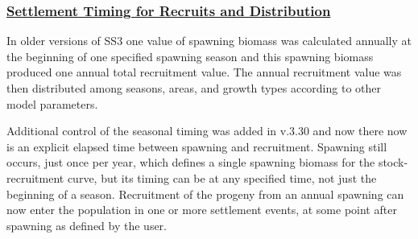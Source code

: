 \hypertarget{SettlementTiming}{}
\subsubsection[Settlement Timing for Recruits and Distribution]{\protect\hyperlink{SettlementTiming}{Settlement Timing for Recruits and Distribution}}
In older versions of SS3 one value of spawning biomass was calculated annually at the beginning of one specified spawning season and this spawning biomass produced one annual total recruitment value. The annual recruitment value was then distributed among seasons, areas, and growth types according to other model parameters.

Additional control of the seasonal timing was added in v.3.30 and now there now is an explicit elapsed time between spawning and recruitment. Spawning still occurs, just once per year, which defines a single spawning biomass for the stock-recruitment curve, but its timing can be at any specified time, not just the beginning of a season. Recruitment of the progeny from an annual spawning can now enter the population in one or more settlement events, at some point after spawning as defined by the user.

